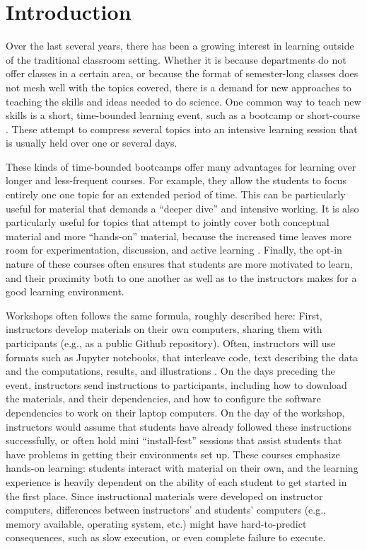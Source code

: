 \section{Introduction}

Over the last several years, there has been a growing interest in learning
outside of the traditional classroom setting. Whether it is because departments
do not offer classes in a certain area, or because the format of semester-long
classes does not mesh well with the topics covered, there is a demand for new
approaches to teaching the skills and ideas needed to do science. One common way
to teach new skills is a short, time-bounded learning event, such as a bootcamp
or short-course \cite{wilson2016software}. These attempt to compress several
topics into an intensive learning session that is usually held over one or
several days.

These kinds of time-bounded bootcamps offer many advantages for learning over
longer and less-frequent courses. For example, they allow the students to focus
entirely one one topic for an extended period of time. This can be particularly
useful for material that demands a ``deeper dive'' and intensive working. It is
also particularly useful for topics that attempt to jointly cover both
conceptual material and more ``hands-on'' material, because the increased time
leaves more room for experimentation, discussion, and active learning
\citep{Bransford2000-lu, Papert1980-fh}. Finally, the opt-in nature of these
courses often ensures that students are more motivated to learn, and their
proximity both to one another as well as to the instructors makes for a good
learning environment.

Workshops often follows the same formula, roughly described here: First,
instructors develop materials on their own computers, sharing them with
participants (e.g., as a public Github repository). Often, instructors will use
formats such as Jupyter notebooks, that interleave code, text describing the
data and the computations, results, and illustrations
\cite{kluyver2016jupyter}. On the days preceding the event, instructors send
instructions to participants, including how to download the materials, and their
dependencies, and how to configure the software dependencies to work on their
laptop computers. On the day of the workshop, instructors would assume that
students have already followed these instructions successfully, or often hold
mini ``install-fest'' sessions that assist students that have problems in
getting their environments set up. These courses emphasize hands-on learning:
students interact with material on their own, and the learning experience is
heavily dependent on the ability of each student to get started in the first
place. Since instructional materials were developed on instructor computers,
differences between instructors' and students' computers (e.g., memory
available, operating system, etc.) might have hard-to-predict consequences, such
as slow execution, or even complete failure to execute.

